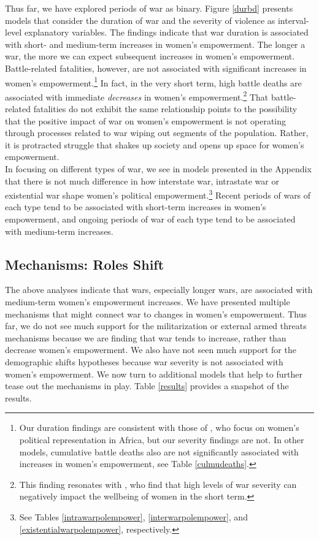 \documentclass [12pt] {article}
\begin{document}
Thus far, we have explored periods of war as binary. Figure \ref{durbd} presents models that consider the duration of war and the severity of violence as interval-level explanatory variables. The findings indicate that war duration is associated with short- and medium-term increases in women's empowerment. The longer a war, the more we can expect subsequent increases in women's empowerment. Battle-related fatalities, however, are not associated with significant increases in women's empowerment.\footnote{Our duration findings are consistent with those of , who focus on women's political representation in Africa, but our severity findings are not. In other models, cumulative battle deaths also are not significantly associated with increases in women's empowerment, see %
Table \ref{culmudeaths}.} In fact, in the very short term, high battle deaths are associated with immediate \emph{decreases} in women's empowerment.\footnote{This finding resonates with , who find that high levels of war severity can negatively impact the wellbeing of women in the short term.}  That battle-related fatalities do not exhibit the same relationship points to the possibility that the positive impact of war on women's empowerment is not operating through processes related to war wiping out segments of the population. Rather, it is protracted struggle that shakes up society and opens up space for women's empowerment.\\

In focusing on different types of war, we see in models presented in the Appendix that there is not much difference in how interstate war, intrastate war or existential war shape women's political empowerment.\footnote{See %
 Tables \ref{intrawarpolempower}, \ref{interwarpolempower}, and \ref{existentialwarpolempower}, respectively.} Recent periods of wars of each type tend to be associated with short-term increases in women's empowerment, and ongoing periods of war of each type tend to be associated with medium-term increases. \\

\subsection*{Mechanisms: Roles Shift}
\vspace*{.2in}

The above analyses indicate that wars, especially longer wars, are associated with medium-term women's empowerment increases. We have presented multiple mechanisms that might connect war to changes in women's empowerment. Thus far, we do not see much support for the militarization or external armed threats mechanisms because we are finding that war tends to increase, rather than decrease women's empowerment. We also have not seen much support for the demographic shifts hypotheses because war severity is not associated with women's empowerment. We now turn to additional models that help to further tease out the mechanisms in play. Table \ref{results} provides a snapshot of the results.\\
\end{document}
